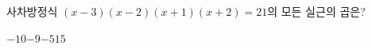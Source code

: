 사차방정식 $(x-3)(x-2)(x+1)(x+2)=21$의 모든 실근의 곱은?
\begin{choices32}{$-10$}{$-9$}{$-5$}{$1$}{$5$}\end{choices32}
